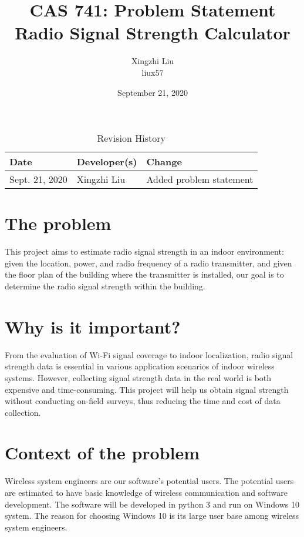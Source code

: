 \documentclass{article}
\title{CAS 741: Problem Statement\\Radio Signal Strength Calculator}
\author{Xingzhi Liu\\liux57}
\date{September 21, 2020}
\begin{document}
\maketitle

\begin{table}[hp]
\caption{Revision History} \label{TblRevisionHistory}
\begin{tabularx}{\textwidth}{llX}
\toprule
\textbf{Date} & \textbf{Developer(s)} & \textbf{Change}\\
\midrule
Sept. 21, 2020 & Xingzhi Liu & Added problem statement\\
\bottomrule
\end{tabularx}
\end{table}

\section{The problem} This project aims to estimate radio signal strength in an indoor environment: given the location, power, and radio frequency of a radio transmitter, and given the floor plan of the building where the transmitter is installed, our goal is to determine the radio signal strength within the building. 
\section{Why is it important?} 
From the evaluation of Wi-Fi signal coverage to indoor localization, radio signal strength data is essential in various application scenarios of indoor wireless systems. However, collecting signal strength data in the real world is both expensive and time-consuming. This project will help us obtain signal strength without conducting on-field surveys, thus reducing the time and cost of data collection.

\section{Context of the problem}
Wireless system engineers are our software's potential users. The potential users are estimated to have basic knowledge of wireless communication and software development. The software will be developed in python 3 and run on Windows 10 system. The reason for choosing Windows 10 is its large user base among wireless system engineers.
\end{document}
